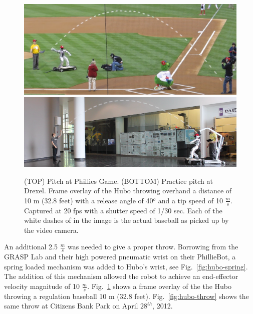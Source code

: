 \begin{figure}[t]
  \centering
\includegraphics[width=1.0\textwidth]{./pix/philliesThrow.png}\\
\includegraphics[width=1.0\textwidth]{./pix/preThrow2.png}
  \caption{(TOP) Pitch at Phillies Game.  (BOTTOM) Practice pitch at Drexel.  Frame overlay of the Hubo throwing overhand a distance of 10 m (32.8 feet) with a release angle of 40$^o$ and a tip speed of 10 $\frac{m}{s}$.  Captured at 20 fps with a shutter speed of 1/30 sec.  Each of the white dashes of in the image is the actual baseball as picked up by the video camera.}
  \label{fig:hubo-throw-test}
\end{figure}

An additional 2.5 $\frac{m}{s}$ was needed to give a proper throw.  
Borrowing from the GRASP Lab and their high powered pneumatic wrist on their PhillieBot, a spring loaded mechanism was added to Hubo's wrist, see Fig.~\ref{fig:hubo-spring}.
The addition of this mechanism allowed the robot to achieve an end-effector velocity magnitude of 10 $\frac{m}{s}$.
Fig.~\ref{fig:hubo-throw-test} shows a frame overlay of the the Hubo throwing a regulation baseball 10 m (32.8 feet).
Fig.~\ref{fig:hubo-throw} shows the same throw at Citizens Bank Park on April $28^{th}$, 2012.




